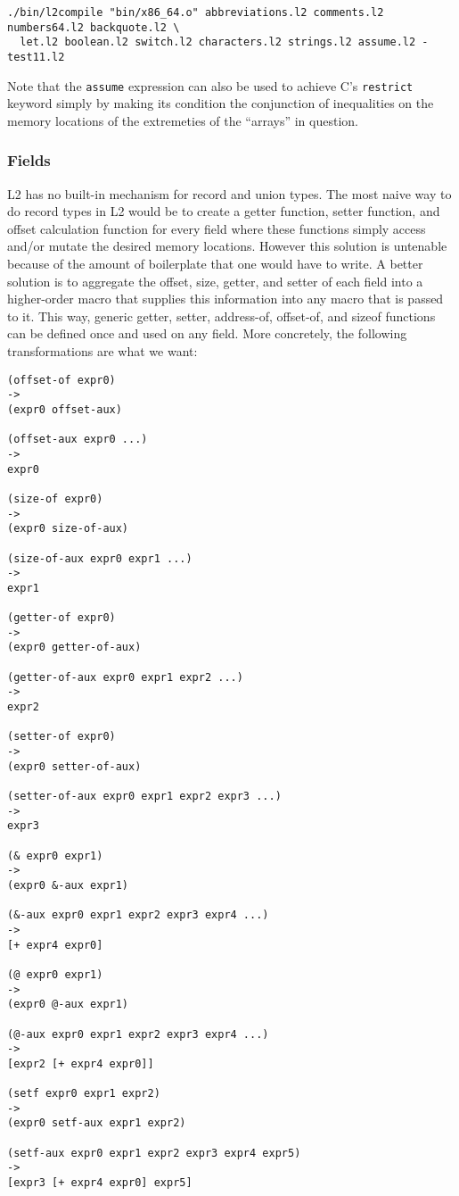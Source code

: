 \documentclass[]{article}
\begin{document}
\begin{verbatim}
./bin/l2compile "bin/x86_64.o" abbreviations.l2 comments.l2 numbers64.l2 backquote.l2 \
  let.l2 boolean.l2 switch.l2 characters.l2 strings.l2 assume.l2 - test11.l2
\end{verbatim}

Note that the \texttt{assume} expression can also be used to achieve C's
\texttt{restrict} keyword simply by making its condition the conjunction
of inequalities on the memory locations of the extremeties of the
``arrays'' in question.

\hypertarget{fields}{\subsubsection{Fields}\label{fields}}

L2 has no built-in mechanism for record and union types. The most naive
way to do record types in L2 would be to create a getter function,
setter function, and offset calculation function for every field where
these functions simply access and/or mutate the desired memory
locations. However this solution is untenable because of the amount of
boilerplate that one would have to write. A better solution is to
aggregate the offset, size, getter, and setter of each field into a
higher-order macro that supplies this information into any macro that is
passed to it. This way, generic getter, setter, address-of, offset-of,
and sizeof functions can be defined once and used on any field. More
concretely, the following transformations are what we want:

\begin{verbatim}
(offset-of expr0)
->
(expr0 offset-aux)

(offset-aux expr0 ...)
->
expr0

(size-of expr0)
->
(expr0 size-of-aux)

(size-of-aux expr0 expr1 ...)
->
expr1

(getter-of expr0)
->
(expr0 getter-of-aux)

(getter-of-aux expr0 expr1 expr2 ...)
->
expr2

(setter-of expr0)
->
(expr0 setter-of-aux)

(setter-of-aux expr0 expr1 expr2 expr3 ...)
->
expr3

(& expr0 expr1)
->
(expr0 &-aux expr1)

(&-aux expr0 expr1 expr2 expr3 expr4 ...)
->
[+ expr4 expr0]

(@ expr0 expr1)
->
(expr0 @-aux expr1)

(@-aux expr0 expr1 expr2 expr3 expr4 ...)
->
[expr2 [+ expr4 expr0]]

(setf expr0 expr1 expr2)
->
(expr0 setf-aux expr1 expr2)

(setf-aux expr0 expr1 expr2 expr3 expr4 expr5)
->
[expr3 [+ expr4 expr0] expr5]
\end{verbatim}
\end{document}
